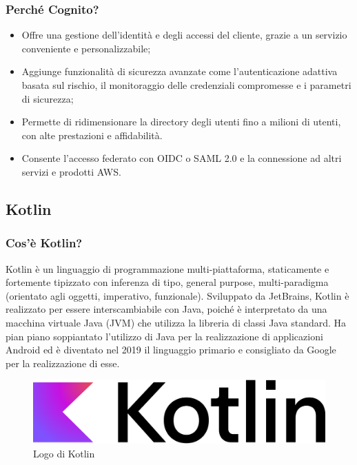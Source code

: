             \subsubsection{Perché Cognito? \cite{AWS5}}
            \begin{itemize}
                \item Offre una gestione dell'identità e degli accessi del cliente, grazie a un servizio conveniente e personalizzabile;
                \item Aggiunge funzionalità di sicurezza avanzate come l'autenticazione adattiva basata sul rischio, il monitoraggio delle credenziali compromesse e i parametri di sicurezza;
                \item Permette di ridimensionare la directory degli utenti fino a milioni di utenti, con alte prestazioni e affidabilità.
                \item Consente l'accesso federato con OIDC o SAML 2.0 e la connessione ad altri servizi e prodotti AWS.
            \end{itemize}
        \subsection{Kotlin}
            \subsubsection{Cos'è Kotlin? \cite{Wikipedia2}}
                Kotlin è un linguaggio di programmazione multi-piattaforma, staticamente e fortemente tipizzato con inferenza di tipo, general purpose, multi-paradigma (orientato agli oggetti, imperativo, funzionale). Sviluppato da JetBrains, Kotlin è realizzato per essere interscambiabile con Java, poiché è interpretato da una macchina virtuale Java (JVM) che utilizza la libreria di classi Java standard. Ha pian piano soppiantato l'utilizzo di Java per la realizzazione di applicazioni Android ed è diventato nel 2019 il linguaggio primario e consigliato da Google per la realizzazione di esse.
            \begin{figure}[htbp!]
                \centering
                \includegraphics[width=0.5\linewidth]{Immagini/System Design/Kotlin.png}
                \caption{Logo di Kotlin}
            \end{figure}
